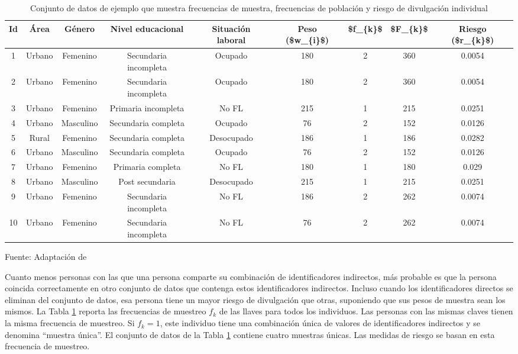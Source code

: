 \documentclass[
]{book}
\theoremstyle{definition}
\theoremstyle{definition}
\theoremstyle{definition}
\theoremstyle{definition}
\theoremstyle{remark}
\begin{document}
\begin{table}

\caption{\label{tab:tabMR1}Conjunto de datos de ejemplo que muestra frecuencias de muestra, frecuencias de población y riesgo de divulgación individual}
\centering
\begin{tabular}[t]{c|c|c|c|c|c|c|c|c}
\hline
Id & Área & Género & Nivel educacional & Situación laboral & Peso (\$w\_\{i\}\$) & \$f\_\{k\}\$ & \$F\_\{k\}\$  & Riesgo (\$r\_\{k\}\$)\\
\hline
1 & Urbano & Femenino & Secundaria incompleta & Ocupado & 180 & 2 & 360 & 0.0054\\
\hline
2 & Urbano & Femenino & Secundaria incompleta & Ocupado & 180 & 2 & 360 & 0.0054\\
\hline
3 & Urbano & Femenino & Primaria incompleta & No FL & 215 & 1 & 215 & 0.0251\\
\hline
4 & Urbano & Masculino & Secundaria completa & Ocupado & 76 & 2 & 152 & 0.0126\\
\hline
5 & Rural & Femenino & Secundaria completa & Desocupado & 186 & 1 & 186 & 0.0282\\
\hline
6 & Urbano & Masculino & Secundaria completa & Ocupado & 76 & 2 & 152 & 0.0126\\
\hline
7 & Urbano & Femenino & Primaria completa & No FL & 180 & 1 & 180 & 0.029\\
\hline
8 & Urbano & Masculino & Post secundaria & Desocupado & 215 & 1 & 215 & 0.0251\\
\hline
9 & Urbano & Femenino & Secundaria incompleta & No FL & 186 & 2 & 262 & 0.0074\\
\hline
10 & Urbano & Femenino & Secundaria incompleta & No FL & 76 & 2 & 262 & 0.0074\\
\hline
\end{tabular}
\end{table}

Fuente: Adaptación de \citep[p.28]{benschop}

Cuanto menos personas con las que una persona comparte su combinación de identificadores indirectos, más probable es que la persona coincida correctamente en otro conjunto de datos que contenga estos identificadores indirectos. Incluso cuando los identificadores directos se eliminan del conjunto de datos, esa persona tiene un mayor riesgo de divulgación que otras, suponiendo que sus pesos de muestra sean los mismos. La Tabla \ref{tab:tabMR1} reporta las frecuencias de muestreo \(f_{k}\) de las llaves para todos los individuos. Las personas con las mismas claves tienen la misma frecuencia de muestreo. Si \(f_{k}=1\), este individuo tiene una combinación única de valores de identificadores indirectos y se denomina ``muestra única''. El conjunto de datos de la Tabla \ref{tab:tabMR1} contiene cuatro muestras únicas. Las medidas de riesgo se basan en esta frecuencia de muestreo.
\end{document}
